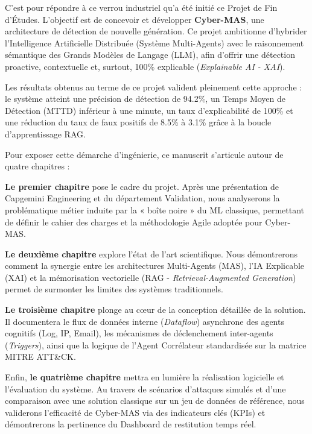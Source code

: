 \documentclass[a4paper, 12pt]{report}
\begin{document}
C'est pour répondre à ce verrou industriel qu'a été initié ce Projet de Fin d'Études. L'objectif est de concevoir et développer \textbf{Cyber-MAS}, une architecture de détection de nouvelle génération. Ce projet ambitionne d'hybrider l'Intelligence Artificielle Distribuée (Système Multi-Agents) avec le raisonnement sémantique des Grands Modèles de Langage (LLM), afin d'offrir une détection proactive, contextuelle et, surtout, 100\% explicable (\textit{Explainable AI - XAI}).

Les résultats obtenus au terme de ce projet valident pleinement cette approche : le système atteint une précision de détection de 94.2\%, un Temps Moyen de Détection (MTTD) inférieur à une minute, un taux d'explicabilité de 100\% et une réduction du taux de faux positifs de 8.5\% à 3.1\% grâce à la boucle d'apprentissage RAG.

Pour exposer cette démarche d'ingénierie, ce manuscrit s'articule autour de quatre chapitres :

\textbf{Le premier chapitre} pose le cadre du projet. Après une présentation de Capgemini Engineering et du département Validation, nous analyserons la problématique métier induite par la « boîte noire » du ML classique, permettant de définir le cahier des charges et la méthodologie Agile adoptée pour Cyber-MAS.

\textbf{Le deuxième chapitre} explore l'état de l'art scientifique. Nous démontrerons comment la synergie entre les architectures Multi-Agents (MAS), l'IA Explicable (XAI) et la mémorisation vectorielle (RAG - \textit{Retrieval-Augmented Generation}) permet de surmonter les limites des systèmes traditionnels.

\textbf{Le troisième chapitre} plonge au cœur de la conception détaillée de la solution. Il documentera le flux de données interne (\textit{Dataflow}) asynchrone des agents cognitifs (Log, IP, Email), les mécanismes de déclenchement inter-agents (\textit{Triggers}), ainsi que la logique de l'Agent Corrélateur standardisée sur la matrice MITRE ATT\&CK.

Enfin, \textbf{le quatrième chapitre} mettra en lumière la réalisation logicielle et l'évaluation du système. Au travers de scénarios d'attaques simulés et d'une comparaison avec une solution classique sur un jeu de données de référence, nous validerons l'efficacité de Cyber-MAS via des indicateurs clés (KPIs) et démontrerons la pertinence du Dashboard de restitution temps réel.

\end{document}
